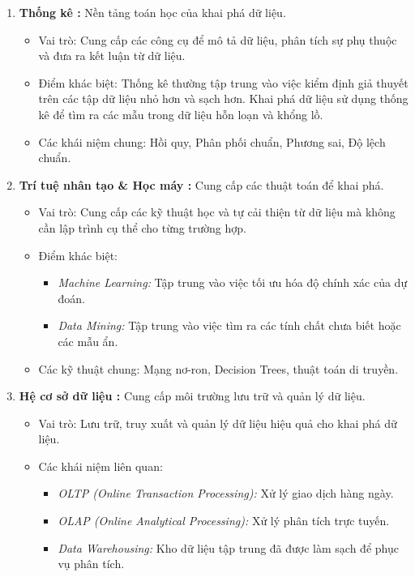 \begin{enumerate}
    \item \textbf{Thống kê :} Nền tảng toán học của khai phá dữ liệu.
    \begin{itemize}
        \item Vai trò: Cung cấp các công cụ để mô tả dữ liệu, phân tích sự phụ thuộc và đưa ra kết luận từ dữ liệu.
        \item Điểm khác biệt: Thống kê thường tập trung vào việc kiểm định giả thuyết trên các tập dữ liệu nhỏ hơn và sạch hơn. Khai phá dữ liệu sử dụng thống kê để tìm ra các mẫu trong dữ liệu hỗn loạn và khổng lồ.
        \item Các khái niệm chung: Hồi quy, Phân phối chuẩn, Phương sai, Độ lệch chuẩn.
    \end{itemize}

    \item \textbf{Trí tuệ nhân tạo \& Học máy :} Cung cấp các thuật toán để khai phá.
    \begin{itemize}
        \item Vai trò: Cung cấp các kỹ thuật học và tự cải thiện từ dữ liệu mà không cần lập trình cụ thể cho từng trường hợp.
        \item Điểm khác biệt:
        \begin{itemize}
            \item \textit{Machine Learning:} Tập trung vào việc tối ưu hóa độ chính xác của dự đoán.
            \item \textit{Data Mining:} Tập trung vào việc tìm ra các tính chất chưa biết hoặc các mẫu ẩn.
        \end{itemize}
        \item Các kỹ thuật chung: Mạng nơ-ron, Decision Trees, thuật toán di truyền.
    \end{itemize}

    \item \textbf{Hệ cơ sở dữ liệu :} Cung cấp môi trường lưu trữ và quản lý dữ liệu.
    \begin{itemize}
        \item Vai trò: Lưu trữ, truy xuất và quản lý dữ liệu hiệu quả cho khai phá dữ liệu.
        \item Các khái niệm liên quan:
        \begin{itemize}
            \item \textit{OLTP (Online Transaction Processing):} Xử lý giao dịch hàng ngày.
            \item \textit{OLAP (Online Analytical Processing):} Xử lý phân tích trực tuyến.
            \item \textit{Data Warehousing:} Kho dữ liệu tập trung đã được làm sạch để phục vụ phân tích.
        \end{itemize}
    \end{itemize}


\end{enumerate}
